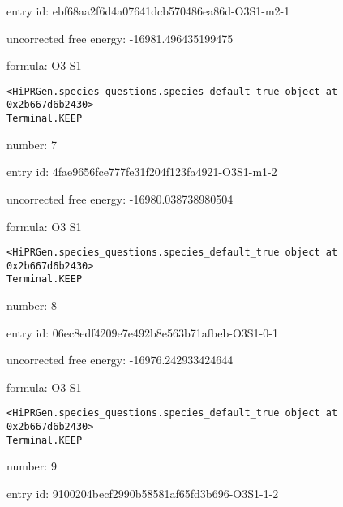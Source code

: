 \documentclass{article}
\begin{document}
entry id: ebf68aa2f6d4a07641dcb570486ea86d-O3S1-m2-1



uncorrected free energy: -16981.496435199475



formula: O3 S1


\vspace{1cm}
\begin{verbatim}
<HiPRGen.species_questions.species_default_true object at 0x2b667d6b2430>
Terminal.KEEP
\end{verbatim}


number: 7



entry id: 4fae9656fce777fe31f204f123fa4921-O3S1-m1-2



uncorrected free energy: -16980.038738980504



formula: O3 S1


\vspace{1cm}
\begin{verbatim}
<HiPRGen.species_questions.species_default_true object at 0x2b667d6b2430>
Terminal.KEEP
\end{verbatim}


number: 8



entry id: 06ec8edf4209e7e492b8e563b71afbeb-O3S1-0-1



uncorrected free energy: -16976.242933424644



formula: O3 S1


\vspace{1cm}
\begin{verbatim}
<HiPRGen.species_questions.species_default_true object at 0x2b667d6b2430>
Terminal.KEEP
\end{verbatim}


number: 9



entry id: 9100204becf2990b58581af65fd3b696-O3S1-1-2
\end{document}
